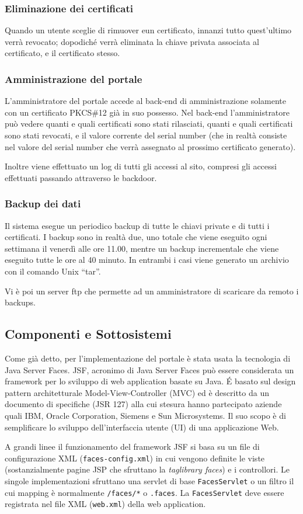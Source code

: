 \documentclass{article}
\begin{document}
\subsubsection*{Eliminazione dei certificati}
Quando un utente sceglie di rimuover eun certificato, innanzi tutto quest'ultimo verrà revocato; dopodiché verrà eliminata la chiave privata associata al certificato, e il certificato stesso.
\subsubsection*{Amministrazione del portale}
L'amministratore del portale accede al back-end di amministrazione solamente con un certificato PKCS\#12 già in suo possesso. Nel back-end l'amministratore può vedere quanti e quali certificati sono stati rilasciati, quanti e quali certificati sono stati revocati, e il valore corrente del serial number (che in realtà consiste nel valore del serial number che verrà assegnato al prossimo certificato generato).
\par Inoltre viene effettuato un log di tutti gli accessi al sito, compresi gli accessi effettuati passando attraverso le backdoor.
\subsubsection*{Backup dei dati}
Il sistema esegue un periodico backup di tutte le chiavi private e di tutti i certificati. I backup sono in realtà due, uno totale che viene eseguito ogni settimana il venerdì alle ore 11.00, mentre un backup incrementale che viene eseguito tutte le ore al 40 minuto. In entrambi i casi viene generato un archivio con il comando Unix ``tar''.
\par Vi è poi un server ftp che permette ad un amministratore di scaricare da remoto i backups.

\subsection{Componenti e Sottosistemi}
Come già detto, per l'implementazione del portale è stata usata la tecnologia di Java Server Faces. JSF, acronimo di Java Server Faces può essere considerata un framework per lo sviluppo di web application basate su Java. \'E basato sul design pattern architetturale Model-View-Controller (MVC) ed è descritto da un documento di specifiche (JSR 127) alla cui stesura hanno partecipato aziende quali IBM, Oracle Corporation, Siemens e Sun Microsystems. Il suo scopo è di semplificare lo sviluppo dell'interfaccia utente (UI) di una applicazione Web.
\par A grandi linee il funzionamento del framework JSF si basa su un file di configurazione XML ({\tt faces-config.xml}) in cui vengono definite le viste (sostanzialmente pagine JSP che sfruttano la \emph{taglibrary faces}) e i controllori. Le singole implementazioni sfruttano una servlet di base {\tt FacesServlet} o un filtro il cui mapping è normalmente {\tt /faces/*} o {\tt *.faces}. La {\tt FacesServlet} deve essere registrata nel file XML ({\tt web.xml}) della web application.
\end{document}
